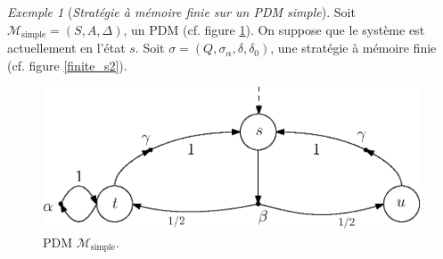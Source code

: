 \documentclass[12pt,a4paper]{report}
\theoremstyle{definition}%
\theoremstyle{remark}
\newtheorem{example}{Exemple}[chapter]
\begin{document}
\begin{example}[\textit{Stratégie à mémoire finie sur un PDM simple}]
	Soit $\mathcal{M}_{\text{simple}} = (S, A, \Delta)$, un PDM (cf. figure \ref{finite_s1}). On suppose que le système est actuellement en l'état $s$.
	Soit $\sigma = (Q, \sigma_\alpha, \delta, \delta_0)$, une stratégie à mémoire finie (cf. figure \ref{finite_s2}).
	\begin{figure}[h]
		\centering
		\captionsetup{justification=centering}
		\begin{minipage}[t][][b]{0.45\textwidth}
		\centering
			\vspace{0.2\textwidth}
			\captionsetup{justification=centering}
			\includegraphics[scale=0.6]{figures/finite_scheduler1}
			\caption{PDM $\mathcal{M}_{\text{simple}}$.}
			\label{finite_s1}
		\end{minipage}
		\hspace{0.05\textwidth}
		\begin{minipage}[t][][b]{0.45\textwidth}
		\centering

\end{minipage}
\end{figure}
\end{example}
\end{document}
